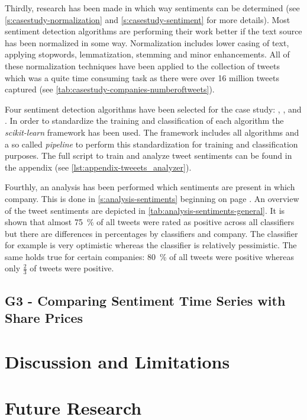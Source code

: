 Thirdly, research has been made in which way sentiments can be determined (see \cref{s:casestudy-normalization} and \cref{s:casestudy-sentiment} for more details).
Most sentiment detection algorithms are performing their work better if the text source has been normalized in some way.
Normalization includes lower casing of text, applying stopwords, lemmatization, stemming and minor enhancements.
All of these normalization techniques have been applied to the collection of tweets which was a quite time consuming task as there were over 16 million tweets captured (see \cref{tab:casestudy-companies-numberoftweets}).

Four sentiment detection algorithms have been selected for the case study: \tb{}, \nb{}, \me{} and \svm{}.
In order to standardize the training and classification of each algorithm the \emph{scikit-learn} framework has been used.
The framework includes all algorithms and a so called \emph{pipeline} to perform this standardization for training and classification purposes.
The full script to train and analyze tweet sentiments can be found in the appendix (see \cref{lst:appendix-tweeets_analyzer}).

Fourthly, an analysis has been performed which sentiments are present in which company.
This is done in \cref{s:analysis-sentiments} beginning on page \pageref{s:analysis-sentiments}.
An overview of the tweet sentiments are depicted in \cref{tab:analysis-sentiments-general}.
It is shown that almost \SI{75}{\percent} of all tweets were rated as positive across all classifiers but there are differences in percentages by classifiers and company.
The \tb{} classifier for example is very optimistic whereas the \nb{} classifier is relatively pessimistic.
The same holds true for certain companies: \SI{80}{\percent} of all \gm{} tweets were positive whereas only $\frac{2}{3}$ of \vw{} tweets were positive.

\subsection{G3 - Comparing Sentiment Time Series with Share Prices}
\label{ss:conclusion-summary-g3}



\section{Discussion and Limitations}
\label{s:conclusions-discussion}

\section{Future Research}
\label{s:conclusions-future}

